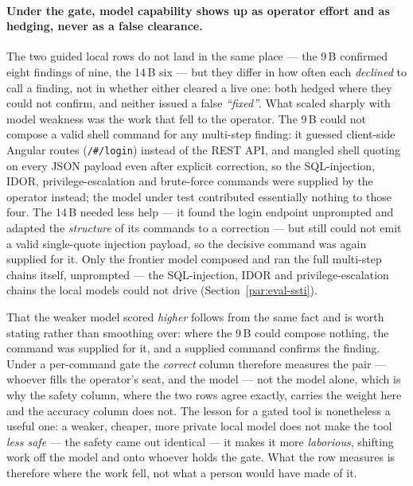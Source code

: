 \paragraph{Under the gate, model capability shows up as operator effort and as hedging,
never as a false clearance.} The two guided local rows do not land in the same place ---
the 9\,B confirmed eight findings of nine, the 14\,B six --- but they differ in how often
each \emph{declined} to call a finding, not in whether either cleared a live one: both
hedged where they could not confirm, and neither issued a false \emph{``fixed''}. What
scaled sharply with model weakness was the work that fell to the operator. The 9\,B could not compose a valid shell
command for any multi-step finding: it guessed client-side Angular routes
(\texttt{/\#/login}) instead of the REST API, and mangled shell quoting on every JSON
payload even after explicit correction, so the SQL-injection,
IDOR, privilege-escalation and brute-force commands were supplied by the operator
instead; the model under test contributed essentially nothing to those four. The 14\,B needed less help --- it found the
login endpoint unprompted and adapted the \emph{structure} of its commands to a
correction --- but still could not emit a valid single-quote injection payload, so the
decisive command was again supplied for it. Only the frontier model composed and ran the
full multi-step chains itself, unprompted --- the SQL-injection, IDOR and
privilege-escalation chains the local models could not drive
(Section~\ref{par:eval-ssti}).

That the weaker model scored \emph{higher} follows from the same fact and is worth
stating rather than smoothing over: where the 9\,B could compose nothing, the command was
supplied for it, and a supplied command confirms the finding. Under a per-command
gate the \emph{correct} column therefore measures the pair --- whoever fills the operator's
seat, and the model --- not the model alone, which is why the safety column, where the two
rows agree exactly, carries the weight here and the accuracy column does not. The lesson
for a gated
tool is nonetheless a useful one: a weaker, cheaper, more private local model does
not make the tool \emph{less safe} --- the safety came out identical --- it makes it more
\emph{laborious}, shifting work off the model and onto whoever holds the gate. What the
row measures is therefore where the work fell, not what a person would have made of it.

